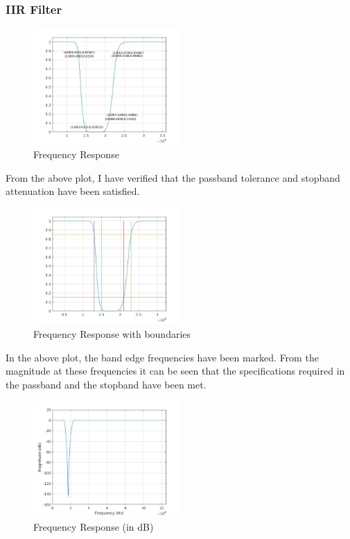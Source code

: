 \documentclass[12pt]{article}
\begin{document}
\subsubsection{IIR Filter}
\begin{figure}[h!]
	\centering	
	\includegraphics[width = 0.5\textwidth]{2fil.jpg}
    \caption{Frequency Response}
\end{figure}
From the above plot, I have verified that the passband tolerance and stopband attenuation have been satisfied. 
\begin{figure}[h!]
	\centering	
	\includegraphics[width = 0.5\textwidth]{2filb.jpg}
    \caption{Frequency Response with boundaries}
\end{figure}
In the above plot, the band edge frequencies have been marked. From the magnitude at these frequencies it can be seen that the specifications required in the passband  and the stopband have been met.
\begin{figure}[h!]
	\centering	
	\includegraphics[width = 0.5\textwidth]{2filp.jpg}
    \caption{Frequency Response (in dB)}
\end{figure}
\end{document}
